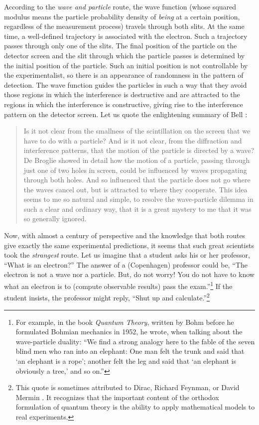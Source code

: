 \documentclass[nofootinbib, secnumarabic, amsmath, nobibnotes,11pt,aps,pra, floatfix]{revtex4-1}
\begin{document}
According to the \textit{wave and particle} route, the wave function (whose squared modulus means the particle probability density of \textit{being} at a certain position, regardless of the measurement process) travels through both slits. At the same time, a well-defined trajectory is associated with the electron. Such a trajectory passes through only one of the slits. The final position of the particle on the detector screen and the slit through which the particle passes is determined by the initial position of the particle. Such an initial position is not controllable by the experimentalist, so there is an appearance of randomness in the pattern of detection. The wave function guides the particles in such a way that they avoid those regions in which the interference is destructive and are attracted to the regions in which the interference is constructive, giving rise to the interference pattern on the detector screen. Let us quote the enlightening summary of Bell \cite{om.Bell1987}:

\begin{quote}
Is it not clear from the smallness of the scintillation on the screen that we have to do with a particle? And is it not clear, from the diffraction and interference patterns, that the motion of the particle is directed by a wave? De Broglie showed in detail how the motion of a particle, passing through just one of two holes in screen, could be influenced by waves propagating through both holes. And so influenced that the particle does not go where the waves cancel out, but is attracted to where they cooperate. This idea seems to me so natural and simple, to resolve the wave-particle dilemma in such a clear and ordinary way, that it is a great mystery to me that it was so generally ignored.
\end{quote}

Now, with almost a century of perspective and the knowledge that both routes give exactly the same experimental predictions, it seems that such great scientists took the \textit{strangest} route. Let us imagine that a student asks his or her professor, ``What is an electron?'' The answer of a (Copenhagen) professor could be, ``The electron is not a wave nor a particle. But, do not worry! You do not have to know what an electron is to (compute observable results) pass the exam.''\footnote{For example, in the book \textit{Quantum Theory}, \cite{om.bohmbook} written by Bohm before he formulated Bohmian mechanics in 1952, he wrote, when talking about the wave-particle duality: ``We find a strong analogy here to the fable of the seven blind men who ran into an elephant: One man felt the trunk and said that `an elephant is a rope'; another felt the leg and said that `an elephant is obviously a tree,' and so on.''} If the student insists, the professor might reply, ``Shut up and calculate.''\footnote{This quote is sometimes attributed to Dirac, Richard Feynman, or David Mermin \cite{om.mermin,om.mermin2}. It recognizes that the important content of the orthodox formulation of quantum theory is the ability to apply mathematical models to real experiments.}
\end{document}
